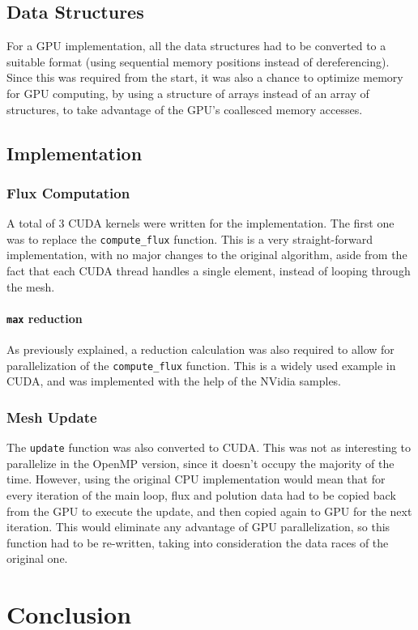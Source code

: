 \documentclass[9pt,twocolumn]{scrartcl}
\newcommand{\paragraphh}[1]{\paragraph{#1\hfill}\hfill

}
\begin{document}
\subsection{Data Structures}
For a GPU implementation, all the data structures had to be converted to a suitable format (using sequential memory positions instead of dereferencing). Since this was required from the start, it was also a chance to optimize memory for GPU computing, by using a structure of arrays instead of an array of structures, to take advantage of the GPU's coallesced memory accesses.

\subsection{Implementation}


\subsubsection{Flux Computation}
A total of 3 CUDA kernels were written for the implementation. The first one was to replace the \texttt{compute\_flux} function. This is a very straight-forward implementation, with no major changes to the original algorithm, aside from the fact that each CUDA thread handles a single element, instead of looping through the mesh.

\paragraphh{\texttt{max} reduction}
As previously explained, a reduction calculation was also required to allow for parallelization of the \texttt{compute\_flux} function. This is a widely used example in CUDA, and was implemented with the help of the NVidia samples.

\subsubsection{Mesh Update}
The \texttt{update} function was also converted to CUDA. This was not as interesting to parallelize in the OpenMP version, since it doesn't occupy the majority of the time. However, using the original CPU implementation would mean that for every iteration of the main loop, flux and polution data had to be copied back from the GPU to execute the update, and then copied again to GPU for the next iteration. This would eliminate any advantage of GPU parallelization, so this function had to be re-written, taking into consideration the data races of the original one.

\section{Conclusion}
\end{document}
